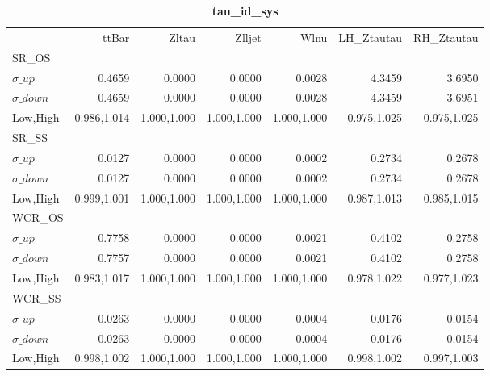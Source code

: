 \documentclass[11pt,oneside,a4paper]{article}
\begin{document}
\begin{table}
\centering
\caption{\bf{tau\_id\_sys}}
\begin{tabular}{lrrrrrr}
& ttBar & Zltau & Zlljet & Wlnu & LH\_Ztautau & RH\_Ztautau \\
SR\_OS &  &  &  &  &  &  \\
$\sigma\_up$ & 0.4659 & 0.0000 & 0.0000 & 0.0028 & 4.3459 & 3.6950 \\
$\sigma\_down$ & 0.4659 & 0.0000 & 0.0000 & 0.0028 & 4.3459 & 3.6951 \\
Low,High & 0.986,1.014 & 1.000,1.000 & 1.000,1.000 & 1.000,1.000 & 0.975,1.025 & 0.975,1.025 \\

\hline
SR\_SS &  &  &  &  &  &  \\
$\sigma\_up$ & 0.0127 & 0.0000 & 0.0000 & 0.0002 & 0.2734 & 0.2678 \\
$\sigma\_down$ & 0.0127 & 0.0000 & 0.0000 & 0.0002 & 0.2734 & 0.2678 \\
Low,High & 0.999,1.001 & 1.000,1.000 & 1.000,1.000 & 1.000,1.000 & 0.987,1.013 & 0.985,1.015 \\

\hline
WCR\_OS &  &  &  &  &  &  \\
$\sigma\_up$ & 0.7758 & 0.0000 & 0.0000 & 0.0021 & 0.4102 & 0.2758 \\
$\sigma\_down$ & 0.7757 & 0.0000 & 0.0000 & 0.0021 & 0.4102 & 0.2758 \\
Low,High & 0.983,1.017 & 1.000,1.000 & 1.000,1.000 & 1.000,1.000 & 0.978,1.022 & 0.977,1.023 \\

\hline
WCR\_SS &  &  &  &  &  &  \\
$\sigma\_up$ & 0.0263 & 0.0000 & 0.0000 & 0.0004 & 0.0176 & 0.0154 \\
$\sigma\_down$ & 0.0263 & 0.0000 & 0.0000 & 0.0004 & 0.0176 & 0.0154 \\
Low,High & 0.998,1.002 & 1.000,1.000 & 1.000,1.000 & 1.000,1.000 & 0.998,1.002 & 0.997,1.003 \\

\hline
\end{tabular}
\end{table}
\end{document}
